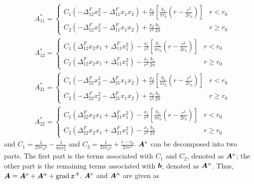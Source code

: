 \documentclass[11pt,letterpaper]{article}
\begin{document}
\begin{eqnarray*}
&A^{*}_{11}  = 
\begin{cases}
 C_1 \left(-\Delta^F_{12} x_2^2-\Delta^F_{11} x_1 x_2 \right) + \frac{x_2}{r^2}\left[\frac{b_1}{\pi r_0}\left(r-\frac{r^2}{2r_0}\right)\right] &r < r_0 \\
C_2 \left(-\Delta^F_{12} x_2^2 - \Delta^F_{11} x_1 x_2 \right) + \frac{x_2}{r^2}\frac{b_1}{2\pi} & r \ge r_0
\end{cases}
\\
&A^{*}_{12}  = 
\begin{cases}
C_1 \left(\Delta^F_{12} x_2 x_1 + \Delta^F_{11} x_1^2\right)- \frac{x_1}{r^2}\left[\frac{b_1}{\pi r_0}\left(r-\frac{r^2}{2r_0}\right)\right]  &r < r_0 \\
C_2 \left(\Delta^F_{12} x_2 x_1 + \Delta^F_{11} x_1^2\right) - \frac{x_1}{r^2}\frac{b_1}{2\pi} & r \ge r_0
\end{cases}
\\
&A^{*}_{21}  = 
\begin{cases}
 C_1 \left(-\Delta^F_{22} x_2^2-\Delta^F_{21} x_1 x_2\right) + \frac{x_2}{r^2}\left[\frac{b_2}{\pi r_0}\left(r-\frac{r^2}{2r_0}\right)\right] &r < r_0 \\
C_2 \left(-\Delta^F_{22} x_2^2 - \Delta^F_{21} x_1 x_2\right) + \frac{x_2}{r^2}\frac{b_2}{2\pi} & r \ge r_0
\end{cases}
\\
&A^{*}_{22}  = 
\begin{cases}
C_1 \left(\Delta^F_{22} x_2 x_1 + \Delta^F_{21} x_1^2\right) - \frac{x_1}{r^2}\left[\frac{b_2}{\pi r_0}\left(r-\frac{r^2}{2r_0}\right)\right] &r < r_0 \\
C_2 \left(\Delta^F_{22} x_2 x_1 + \Delta^F_{21} x_1^2\right) - \frac{x_1}{r^2}\frac{b_2}{2\pi} & r \ge r_0
\end{cases}
\end{eqnarray*}
and $C_1= \frac{1}{2\pi r_0 r}- \frac{1}{6 \pi r_0^2}$ and $C_2=\frac{1}{3\pi r_0 r}+\frac{r-r_0}{2\pi r^3}$. $\bfA^{*}$ can be decomposed into two parts. The first part is the terms associated with $C_1$ and $C_2$, denoted as $\bfA^o$; the other part is the remaining terms associated with $\bfb$, denoted as $\bfA^{\alpha}$. Thus, $\bfA=\bfA^o+\bfA^{\alpha}+\grad \bfz^A$. $\bfA^o$ and $\bfA^{\alpha}$ are given as 
\end{document}
